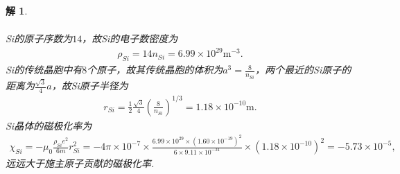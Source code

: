 \documentclass[UTF8,10pt,a4paper]{article}
\theoremstyle{Problem}
\theoremstyle{Solution}
\newtheorem*{sol}{解}
\begin{document}
\begin{sol}
\begin{enumerate}
\begin{align}
        \end{align}
        Si的原子序数为$14$，故Si的电子数密度为
        \begin{align}
            \rho_{Si}=14n_{Si}=6.99\times 10^{29}\text{m}^{-3}.
        \end{align}
        Si的传统晶胞中有$8$个原子，故其传统晶胞的体积为$a^3=\frac{8}{n_{Si}}$，两个最近的Si原子的距离为$\frac{\sqrt{3}}{4}a$，故Si原子半径为
        \begin{align}
            r_{Si}=\frac{1}{2}\frac{\sqrt{3}}{4}\left(\frac{8}{n_{Si}}\right)^{1/3}=1.18\times 10^{-10}\text{m}.
        \end{align}
        Si晶体的磁极化率为
        \begin{align}
            \chi_{Si}=-\mu_0\frac{\rho_{Si}e^2}{6m}r_{Si}^2=-4\pi\times 10^{-7}\times\frac{6.99\times 10^{29}\times(1.60\times 10^{-19})^2}{6\times 9.11\times 10^{-31}}\times(1.18\times 10^{-10})^2=-5.73\times 10^{-5},
        \end{align}
        远远大于施主原子贡献的磁极化率.
    \end{enumerate}
\end{sol}
\end{document}
